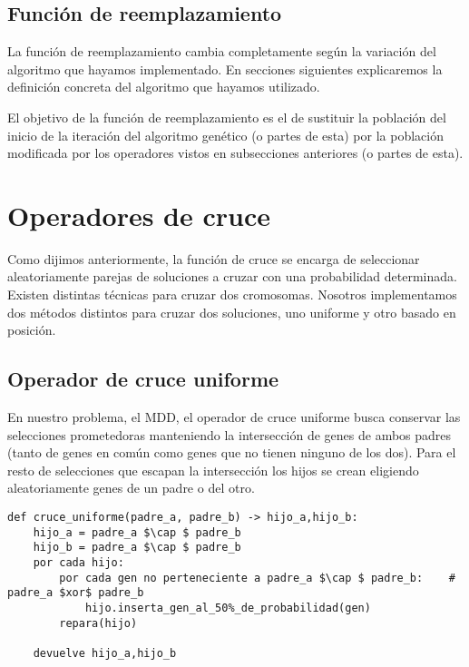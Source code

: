 \subsection{Función de reemplazamiento}

La función de reemplazamiento cambia completamente según la variación del algoritmo que hayamos
implementado. En secciones siguientes explicaremos la definición concreta del algoritmo que hayamos
utilizado.

El objetivo de la función de reemplazamiento es el de sustituir la población del inicio de la iteración
del algoritmo genético (o partes de esta) por la población modificada por los operadores vistos en subsecciones
anteriores (o partes de esta).

\section{Operadores de cruce}

Como dijimos anteriormente, la función de cruce se encarga de seleccionar aleatoriamente parejas de soluciones a cruzar
con una probabilidad determinada. Existen distintas técnicas para cruzar dos cromosomas.
Nosotros implementamos dos métodos distintos para cruzar dos soluciones, uno uniforme y otro basado en posición.

\subsection{Operador de cruce uniforme}

En nuestro problema, el MDD, el operador de cruce uniforme busca conservar las selecciones prometedoras manteniendo
la intersección de genes de ambos padres (tanto de genes en común como genes que no tienen ninguno de los dos). Para el
resto de selecciones que escapan la intersección los hijos se crean eligiendo aleatoriamente genes de un padre o del otro.

\begin{minipage}{\textwidth}
\begin{lstlisting}[mathescape=true,caption={Definición del operador de cruce uniforme.},captionpos=b]
def cruce_uniforme(padre_a, padre_b) -> hijo_a,hijo_b:
	hijo_a = padre_a $\cap $ padre_b
	hijo_b = padre_a $\cap $ padre_b
	por cada hijo:
		por cada gen no perteneciente a padre_a $\cap $ padre_b:	# padre_a $xor$ padre_b
			hijo.inserta_gen_al_50%_de_probabilidad(gen)
		repara(hijo)

	devuelve hijo_a,hijo_b
\end{lstlisting}
\end{minipage}

